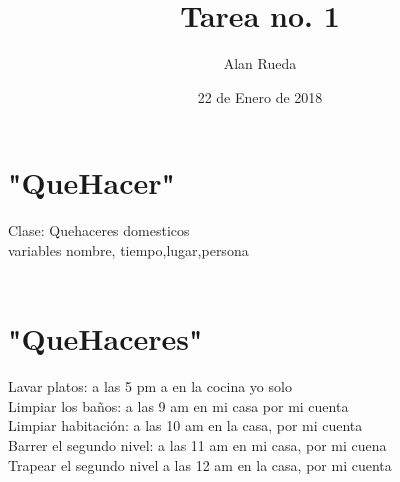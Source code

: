 \documentclass[8pt, a4paper]{article} %
\author{Alan Rueda} %
\date{22 de Enero de 2018} %
\begin{document}
  \title{Tarea no. 1} %
   \maketitle %
   
    \section{"QueHacer"} %
      Clase: Quehaceres domesticos\\ 
      variables nombre, tiempo,lugar,persona\\
           \\ 
          
    \section{"QueHaceres"} %
    \begin{sloppypar} %
     Lavar platos: a las 5 pm a en la cocina yo solo\\
     Limpiar los baños: a las 9 am en mi casa por mi cuenta\\
     Limpiar habitación: a las 10 am en la casa, por mi cuenta\\
     Barrer el segundo nivel: a las 11 am en mi casa, por mi cuena\\
     Trapear el segundo nivel a las 12 am en la casa, por mi cuenta\\
 
    \end{sloppypar}  
    
        
\end{document}
